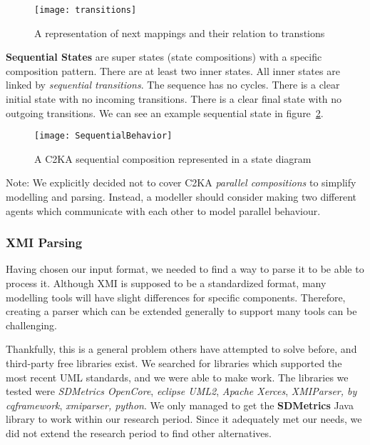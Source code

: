 \begin{figure}[h]
    \centering
    \texttt{[image: transitions]}
    \caption{A representation of next mappings and their relation to transtions}
    \label{fig:transition}
\end{figure}

\textbf{Sequential States} are super states (state compositions) with a specific composition pattern.
There are at least two inner states.
All inner states are linked by \textit{sequential transitions}.
The sequence has no cycles.
There is a clear initial state with no incoming transitions.
There is a clear final state with no outgoing transitions.
We can see an example sequential state in figure~\ref{fig:sequential}.

\begin{figure}[h]
    \centering
    \texttt{[image: SequentialBehavior]}
    \caption{A C2KA sequential composition represented in a state diagram}
    \label{fig:sequential}
\end{figure}

Note: We explicitly decided not to cover C2KA \textit{parallel compositions} to simplify modelling and parsing.
Instead, a modeller should consider making two different agents which communicate
with each other to model parallel behaviour.

\subsubsection{XMI Parsing}\label{subsubsec:parsing}
Having chosen our input format, we needed to find a way to parse it to be able to process it.
Although XMI is supposed to be a standardized format,
many modelling tools will have slight differences for specific components.
Therefore, creating a parser which can be extended generally to support many tools can be challenging.

Thankfully, this is a general problem others have attempted to solve before, and third-party free libraries exist.
We searched for libraries which supported the most recent UML standards, and we were able to make work.
The libraries we tested were \textit{SDMetrics OpenCore},
\textit{eclipse UML2}, \textit{Apache Xerces}, \textit{XMIParser, by cqframework}, \textit{xmiparser, python}.
We only managed to get the \textbf{SDMetrics} Java library to work within our research period.
Since it adequately met our needs, we did not extend the research period to find other alternatives.

